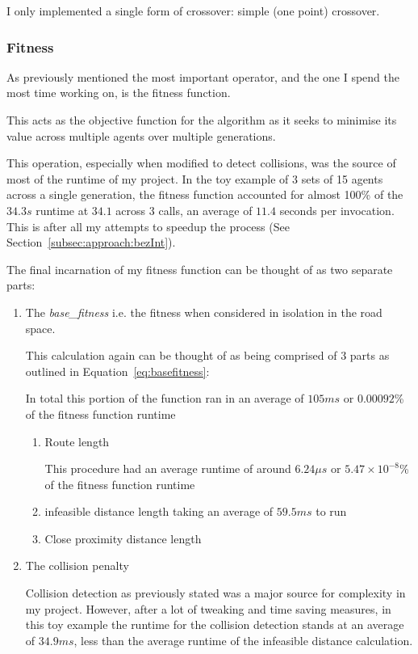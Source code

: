 I only implemented a single form of crossover: simple (one point) crossover.


\subsubsection{Fitness}

As previously mentioned the most important operator, and the one I spend the most time working on, is the fitness function.

This acts as the objective function for the algorithm as it seeks to minimise its value across multiple agents over multiple generations.

This operation, especially when modified to detect collisions, was the source of most of the runtime of my project. In the toy example of 3 sets of 15 agents across a single generation, the fitness function accounted for almost 100\% of the $34.3s$ runtime at $34.1$ across 3 calls, an average of $11.4$ seconds per invocation. This is after all my attempts to speedup the process (See Section~\ref{subsec:approach:bezInt}).

The final incarnation of my fitness function can be thought of as two separate parts:

\begin{enumerate}
  \item The \textit{base\_fitness} i.e. the fitness when considered in isolation in the road space.

        This calculation again can be thought of as being comprised of 3 parts as outlined in Equation~\ref{eq:basefitness}:

        In total this portion of the function ran in an average of $105ms$ or $0.00092$\% of the fitness function runtime

        \begin{enumerate}
          \item Route length

                This procedure had an average runtime of around $6.24 \mu s$ or $5.47\times 10^{-8}$\% of the fitness function
                runtime
          \item infeasible distance length taking an average of $59.5ms$ to run
          \item Close proximity distance length

        \end{enumerate}


  \item The collision penalty

        Collision detection as previously stated was a major source for complexity in my project. However, after a lot of tweaking and time saving measures, in this toy example the runtime for the collision detection stands at an average of $34.9ms$, less than the average runtime of the infeasible distance calculation.
\end{enumerate}


